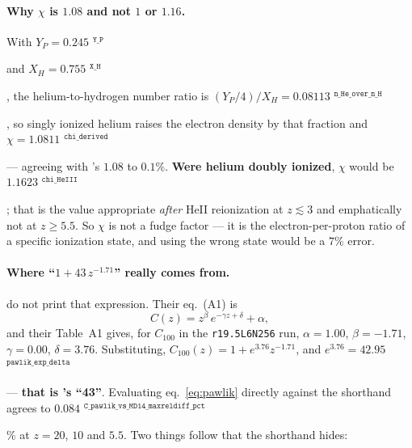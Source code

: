 \documentclass[11pt,a4paper]{article}
\newif\ifprovdraft
\newcommand{\src}[1]{%
  \ifprovdraft
    \ifmmode{}^{\text{\color{gray}\scriptsize\texttt{#1}}}%
    \else{\color{gray}\scriptsize$^{\texttt{#1}}$}%
    \fi
  \fi}
\begin{document}
\paragraph{Why $\chi$ is $1.08$ and not $1$ or $1.16$.} With
$Y_P = 0.245$\src{Y\_P} and $X_H = 0.755$\src{X\_H}, the helium-to-hydrogen
number ratio is $(Y_P/4)/X_H = 0.08113$\src{n\_He\_over\_n\_H}, so singly
ionized helium raises the electron density by that fraction and
$\chi = 1.0811$\src{chi\_derived} --- agreeing with \cite{md14}'s $1.08$ to
$0.1\%$. \textbf{Were helium doubly ionized}, $\chi$ would be
$1.1623$\src{chi\_HeIII}; that is the value appropriate \emph{after} HeII
reionization at $z\lesssim3$ and emphatically not at $z\ge5.5$. So $\chi$ is
not a fudge factor --- it is the electron-per-proton ratio of a specific
ionization state, and using the wrong state would be a $7\%$ error.

\paragraph{Where ``$1 + 43\,z^{-1.71}$'' really comes from.}
\cite{pawlik09} do not print that expression. Their eq.~(A1) is
\begin{equation}
  C(z) = z^{\beta}\,e^{-\gamma z + \delta} + \alpha ,
  \label{eq:pawlik}
\end{equation}
and their Table~A1 gives, for $C_{100}$ in the \texttt{r19.5L6N256} run,
$\alpha = 1.00$, $\beta = -1.71$, $\gamma = 0.00$, $\delta = 3.76$. Substituting,
$C_{100}(z) = 1 + e^{3.76}z^{-1.71}$, and
$e^{3.76} = 42.95$\src{pawlik\_exp\_delta} --- \textbf{that is \cite{md14}'s
``43''}. Evaluating eq.~\eqref{eq:pawlik} directly against the shorthand agrees
to $0.084$\src{C\_pawlik\_vs\_MD14\_maxreldiff\_pct}\% at $z = 20$, $10$ and
$5.5$. Two things follow that the shorthand hides:
\end{document}
